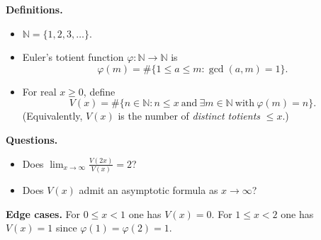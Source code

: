 \textbf{Definitions.}
\begin{itemize}
\item $\mathbb{N}=\{1,2,3,\dots\}$.
\item Euler's totient function $\varphi:\mathbb{N}\to\mathbb{N}$ is
\[
\varphi(m)=\#\{1\le a\le m : \gcd(a,m)=1\}.
\]
\item For real $x\ge 0$, define
\[
V(x)=\#\{n\in\mathbb{N}: n\le x \ \text{and}\ \exists m\in\mathbb{N}\ \text{with}\ \varphi(m)=n\}.
\]
(Equivalently, $V(x)$ is the number of \emph{distinct totients} $\le x$.)
\end{itemize}

\textbf{Questions.}
\begin{itemize}
\item[(Q1)] Does $\displaystyle \lim_{x\to\infty} \frac{V(2x)}{V(x)}=2$?
\item[(Q2)] Does $V(x)$ admit an asymptotic formula as $x\to\infty$?
\end{itemize}
\textbf{Edge cases.} For $0\le x<1$ one has $V(x)=0$. For $1\le x<2$ one has $V(x)=1$ since $\varphi(1)=\varphi(2)=1$.
